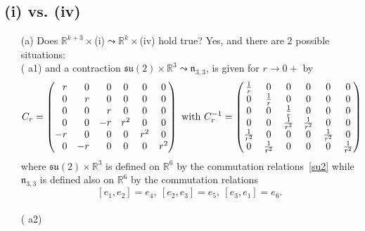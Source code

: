 \documentclass[
reqno]{amsart}
\begin{document}
\subsection{(i) vs. (iv)}\label{Case3}\hfill 
\begin{itemize}
\item[(a)] Does ${{\mathbb R}}^{k+3}\times$(i)${\leadsto}$${{\mathbb R}}^k\times$(iv) hold true? 
Yes, and there are 2 possible situations: 
\\ ({{\bfseries\itshape} a1})  
and a contraction ${{\mathfrak s}{\mathfrak u}}(2)\times{{\mathbb R}}^3{\leadsto} {{\mathfrak n}}_{3,3}$, 
is given for $r\to 0+$ by 
$$C_r
=\begin{pmatrix}
\hfill r & \hfill 0 & \hfill 0 & 0   & 0   & 0 \\
\hfill 0 & \hfill r & \hfill 0 & 0   & 0   & 0 \\
\hfill 0 & \hfill 0 & \hfill r & 0   & 0   & 0 \\
\hfill 0 & \hfill 0 &       -r & r^2 & 0   & 0 \\
      -r & \hfill 0 & \hfill 0 & 0   & r^2 & 0 \\
\hfill 0 &       -r & \hfill 0 & 0   & 0   & r^2 
\end{pmatrix}
\text{ with }
C_r^{-1}=
\begin{pmatrix}
 \frac{1}{r}  &  0                 &   0 & 0   & 0   & 0 \\
 0            &  \frac{1}{r}       &   0 & 0   & 0   & 0 \\
 0            &  0   &  \frac{1}{r}            &  0  & 0   & 0 \\
 0            &  0 & \frac{1}{r^2} & \frac{1}{r^2} & 0   & 0 \\
\frac{1}{r^2} &  0 &  0      & 0  & \frac{1}{r^2} & 0 \\
 0            &\frac{1}{r^2} &   0 & 0   & 0   & \frac{1}{r^2} \end{pmatrix}
$$
where ${{\mathfrak s}{\mathfrak u}}(2)\times{{\mathbb R}}^3$ is defined on ${{\mathbb R}}^6$ by the commutation relations~\eqref{su2}
while ${{\mathfrak n}}_{3,3}$ is defined also on ${{\mathbb R}}^6$ 
by the commutation relations 
\begin{equation}\label{N33}
[e_1,e_2]=e_4,\ [e_2,e_3]=e_5,\ [e_3,e_1]=e_6. 
\end{equation}
\\ ({{\bfseries\itshape} a2})  
$$
\end{itemize}
\end{document}
